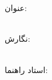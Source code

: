 
\pagestyle{empty}

\begin{center}

\begin{figure}[h]
    \centering
    \def\svgwidth{2cm}
    
\end{figure}

\begin{Large}

\vspace{-0.2cm}
\ThesisUniversity \\[-0.3em]
\ThesisDepartment

\vspace{0.5cm}

\SeminarType \\[-0.3em]
\ThesisMajor

\end{Large}

\vspace{1cm}

\large{عنوان:}\\[-.5em]
\huge{\textbf{\ThesisHugeTitle}}\\

\vspace{1cm}

\large{نگارش:}\\
\Large{\textbf{\ThesisAuthor}}\\

\vspace{0.7cm}

\large{استاد راهنما:}\\ 
\Large{\textbf{\ThesisSupervisor}}\\

\vspace{0.8cm}

\large{\ThesisDate}

\end{center}

\newpage
